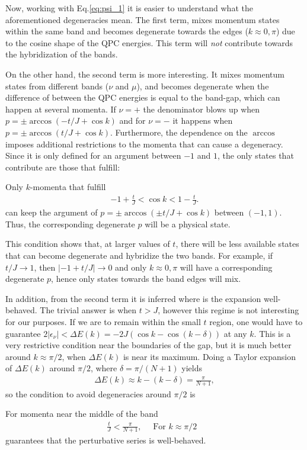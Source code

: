 \documentclass{article}
\begin{document}
Now, working with Eq.\eqref{eq:psi_1} it is easier to understand what the aforementioned degeneracies mean. The first term, mixes momentum states within the same band and becomes degenerate towards the edges ($k\approx 0, \pi$) due to the cosine shape of the QPC energies. This term will \textit{not} contribute towards the hybridization of the bands. 

On the other hand, the second term is more interesting. It mixes momentum states from different bands ($\nu$ and $\mu$), and becomes degenerate when the difference of between the QPC energies is equal to the band-gap, which can happen at several momenta. If $\nu = +$ the denominator blows up when $p=\pm \arccos(-t/J + \cos k)$ and for $\nu = -$ it happens when $p=\pm \arccos(t/J + \cos k)$. Furthermore, the dependence on the $\arccos$ imposes additional restrictions to the momenta that can cause a degeneracy. Since it is only defined for an argument between $-1$ and $1$, the only states that contribute are those that fulfill:

\begin{tcolorbox}[title=Arccosine condition, colback=white, colframe=black]
Only $k$-momenta that fulfill
\begin{align}\label{eq:arccos_condition}
    -1 + \frac{t}{J} < \cos k < 1 - \frac{t}{J}.
\end{align}
can keep the argument of $p=\pm \arccos(\pm t/J + \cos k)$ between $(-1,1)$. Thus, the corresponding degenerate $p$ will be a physical state.
\end{tcolorbox}

This condition shows that, at larger values of $t$, there will be less available states that can become degenerate and hybridize the two bands. For example, if $t/J\rightarrow 1$, then $|-1+t/J|\rightarrow 0$ and only $k\approx 0,  \pi$ will have a corresponding degenerate $p$, hence only states towards the band edges will mix.

In addition, from the second term it is inferred where is the expansion well-behaved. The trivial answer is when $t>J$, however this regime is not interesting for our purposes. If we are to remain within the small $t$ region, one would have to guarantee $2 |\epsilon_\nu| < \Delta E(k) = -2J(\cos k - \cos(k-\delta))$ at any $k$. This is a very restrictive condition near the boundaries of the gap, but it is much better around $k\approx \pi/2$, when $\Delta E(k)$ is near its maximum. Doing a Taylor expansion of $\Delta E(k)$ around $\pi/2$, where $\delta = \pi/(N+1)$ yields
\begin{align}
    \Delta E(k) \approx k - (k - \delta) = \frac{\pi}{N+1},
\end{align}
so the condition to avoid degeneracies around $\pi/2$ is
\begin{tcolorbox}[title=Non-degeneracy condition, colback=white, colframe=black]
    For momenta near the middle of the band
\begin{align}\label{eq:degen_condition}
    \frac{t}{J}<\frac{\pi}{N+1}, \quad \text{ For $k\approx\pi/2$ }
\end{align}
    guarantees that the perturbative series is well-behaved.
\end{tcolorbox}
\end{document}
